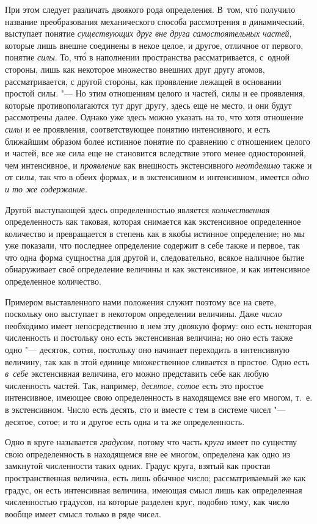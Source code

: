 При этом следует различать двоякого рода определения. В~том, чт\'{о} получило
название преобразования механического способа рассмотрения в динамический,
выступает понятие {\em существующих друг вне друга самостоятельных частей},
которые лишь внешне соединены в некое целое, и другое, отличное от первого,
понятие {\em силы}. То, чт\'{о} в наполнении пространства рассматривается,
с~одной стороны, лишь как некоторое множество внешних друг другу атомов,
рассматривается, с другой стороны, как проявление лежащей в основании простой
силы. "--- Но этим отношениям целого и частей, силы и ее проявления, которые
противополагаются тут друг другу, здесь еще не место, и они будут рассмотрены
далее. Однако уже здесь можно указать на то, что хотя отношение {\em силы} и ее
проявления, соответствующее понятию интенсивного, и есть ближайшим образом
более истинное понятие по сравнению с отношением целого и частей, все же сила
еще не становится вследствие этого менее односторонней, чем интенсивное, и
{\em проявление} как внешность экстенсивного {\em неотделимо} также и от силы,
так что в обеих формах, и в экстенсивном и интенсивном, имеется
{\em одно и то же содержание}.

Другой выступающей здесь определенностью является {\em количественная}
определенность как таковая, которая снимается как экстенсивное определенное
количество и превращается в степень как в якобы истинное определение; но мы уже
показали, что последнее определение содержит в себе также и первое, так что
одна форма сущностна для другой и, следовательно, всякое наличное бытие
обнаруживает своё определение величины и как экстенсивное, и как интенсивное определенное
количество.

Примером выставленного нами положения служит поэтому все на свете, поскольку
оно выступает в некотором определении величины. Даже {\em число} необходимо
имеет непосредственно в нем эту двоякую форму: оно есть некоторая численность и
постольку оно есть экстенсивная величина; но оно есть также одно "--- десяток,
сотня, постольку оно начинает переходить в интенсивную величину, так как в этой
единице множественное сливается в простое. Одно есть {\em в~себе} экстенсивная
величина, его можно представить себе как любую численность частей. Так,
например, {\em десятое, сотое} есть это простое интенсивное, имеющее свою
определенность в находящемся вне его многом, т.~е. в экстенсивном. Число есть
десять, сто и вместе с тем в системе чисел "--- десятое, сотое; и то и другое
есть одна и та же определенность.

Одно в круге называется {\em градусом}, потому что часть {\em круга} имеет по
существу свою определенность в находящемся вне ее многом, определена как одно
из замкнутой численности таких одних. Градус круга, взятый как простая
пространственная величина, есть лишь обычное число; рассматриваемый же как
градус, он есть интенсивная величина, имеющая смысл лишь как определенная
численностью градусов, на которые разделен круг, подобно тому, как число вообще
имеет смысл только в ряде чисел.

